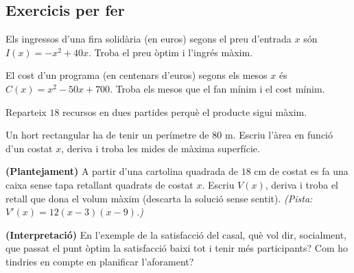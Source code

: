 \subsection{Exercicis per fer}

\begin{exercicis}
\begin{exlist}
  \item Els ingressos d'una fira solidària (en euros) segons el preu d'entrada $x$ són
        $I(x)=-x^2+40x$. Troba el preu òptim i l'ingrés màxim.
  \item El cost d'un programa (en centenars d'euros) segons els mesos $x$ és
        $C(x)=x^2-50x+700$. Troba els mesos que el fan mínim i el cost mínim.
  \item Reparteix $18$ recursos en dues partides perquè el producte sigui màxim.
  \item Un hort rectangular ha de tenir un perímetre de $80$ m. Escriu l'àrea en funció
        d'un costat $x$, deriva i troba les mides de màxima superfície.
  \item \textbf{(Plantejament)} A partir d'una cartolina quadrada de $18$ cm de costat
        es fa una caixa sense tapa retallant quadrats de costat $x$. Escriu $V(x)$,
        deriva i troba el retall que dona el volum màxim (descarta la solució sense
        sentit). \emph{(Pista: $V'(x)=12(x-3)(x-9)$.)}
  \item \textbf{(Interpretació)} En l'exemple de la satisfacció del casal, què vol dir,
        socialment, que passat el punt òptim la satisfacció baixi tot i tenir més
        participants? Com ho tindries en compte en planificar l'aforament?
\end{exlist}
\end{exercicis}

